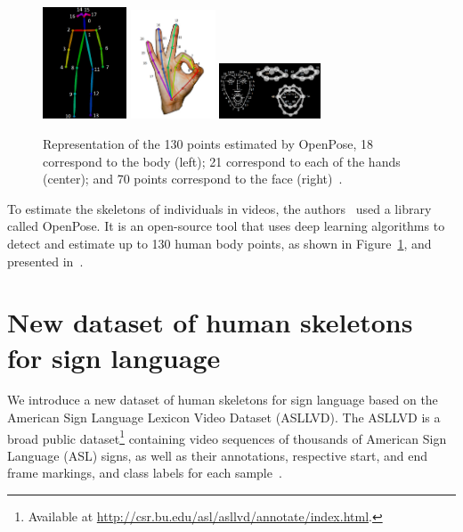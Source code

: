 \begin{figure}[ht]
    \centering
    \includegraphics[width=2.5cm]{images/keypoints_pose_COCO_18}
    \includegraphics[width=2.5cm]{images/keypoints_hand}
    \includegraphics[width=3cm]{images/keypoints_face}
    \caption{Representation of the 130 points estimated by OpenPose, 18 correspond to the body (left); 21 correspond to each of the hands (center); and 70 points correspond to the face (right)~\cite{openpose-output-2018}.}
    \label{fig:keypoints-openpose}
\end{figure}

To estimate the skeletons of individuals in videos, the authors~\cite{st-gcn-2018} used a library called OpenPose. It is an open-source tool that uses deep learning algorithms to detect and estimate up to 130 human body points, as shown in Figure~\ref{fig:keypoints-openpose}, and presented in~\cite{cao-realtime-2017,simon-hand-2017,wei-cpm-2016}.


\section{New dataset of human skeletons for sign language} 
\label{sec:new-dataset}

We introduce a new dataset of human skeletons for sign language based on the American Sign Language Lexicon Video Dataset (ASLLVD). The ASLLVD  is a broad public dataset\footnote{ Available at \url{http://csr.bu.edu/asl/asllvd/annotate/index.html}.} containing video sequences of thousands of American Sign Language (ASL) signs, as well as their annotations, respective start, and end frame markings, and class labels for each sample~\cite{athitsos-asllvd-2008,neidle-2012,vloger-2012}.

